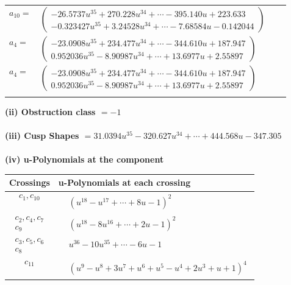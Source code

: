 \documentclass[1p]{elsarticle_modified}
\theoremstyle{definition}
\begin{document}
\begin{tabular}{m{7pt} m{180pt} m{7pt} m{180pt} }
\flushright $a_{10}=$&$\begin{pmatrix}-26.5737 u^{35}+270.228 u^{34}+\cdots-395.140 u+223.633\\-0.323427 u^{35}+3.24528 u^{34}+\cdots-7.68584 u-0.142044\end{pmatrix}$ \\
\flushright $a_{4}=$&$\begin{pmatrix}-23.0908 u^{35}+234.477 u^{34}+\cdots-344.610 u+187.947\\0.952036 u^{35}-8.90987 u^{34}+\cdots+13.6977 u+2.55897\end{pmatrix}$\\ \flushright $a_{4}=$&$\begin{pmatrix}-23.0908 u^{35}+234.477 u^{34}+\cdots-344.610 u+187.947\\0.952036 u^{35}-8.90987 u^{34}+\cdots+13.6977 u+2.55897\end{pmatrix}$\\&\end{tabular}
\flushleft \textbf{(ii) Obstruction class $= -1$}\\~\\
\flushleft \textbf{(iii) Cusp Shapes $= 31.0394 u^{35}-320.627 u^{34}+\cdots+444.568 u-347.305$}\\~\\
\newpage\renewcommand{\arraystretch}{1}
\flushleft \textbf{(iv) u-Polynomials at the component}\newline \\
\begin{tabular}{m{50pt}|m{274pt}}
Crossings & \hspace{64pt}u-Polynomials at each crossing \\
\hline $$\begin{aligned}c_{1},c_{10}\end{aligned}$$&$\begin{aligned}
&(u^{18}- u^{17}+\cdots+8 u-1)^{2}
\end{aligned}$\\
\hline $$\begin{aligned}c_{2},c_{4},c_{7}\\c_{9}\end{aligned}$$&$\begin{aligned}
&(u^{18}-8 u^{16}+\cdots+2 u-1)^{2}
\end{aligned}$\\
\hline $$\begin{aligned}c_{3},c_{5},c_{6}\\c_{8}\end{aligned}$$&$\begin{aligned}
&u^{36}-10 u^{35}+\cdots-6 u-1
\end{aligned}$\\
\hline $$\begin{aligned}c_{11}\end{aligned}$$&$\begin{aligned}
&(u^9- u^8+3 u^7+u^6+u^5- u^4+2 u^3+u+1)^4
\end{aligned}$\\
\hline
\end{tabular}\\~\\
\end{document}

